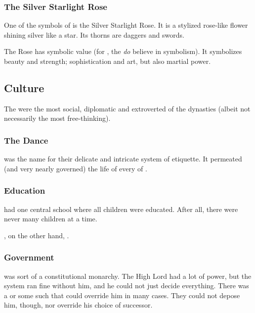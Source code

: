 \subsubsection{The Silver Starlight Rose}
One of the symbols of \CiriathSepher{} is the Silver Starlight Rose. 
It is a stylized rose-like flower shining silver like a star. 
Its thorns are daggers and swords. 

The Rose has symbolic value (for , the \CiriathSepher{} \emph{do} believe in symbolism). 
It symbolizes beauty and strength; sophistication and art, but also martial power. 









\subsection{Culture}
The \CiriathSepher{} were the most social, diplomatic and extroverted of the dynasties (albeit not necessarily the most free-thinking). 





\subsubsection{The Dance}
 was the \CiriathSepher{} name for their delicate and intricate system of etiquette. 
It permeated (and very nearly governed) the life of every \resphan of \CiriathSepher{}. 





\subsubsection{Education}
\CiriathSepher{} had one central school where all children were educated. 
After all, there were never many children at a time. 

\Mystraacht, on the other hand, . 






\subsubsection{Government}
\CiriathSepher{} was sort of a constitutional monarchy. 
The High Lord had a lot of power, but the system ran fine without him, and he could not just decide everything. 
There was a  or some such that could override him in many cases. 
They could not depose him, though, nor override his choice of successor. 

